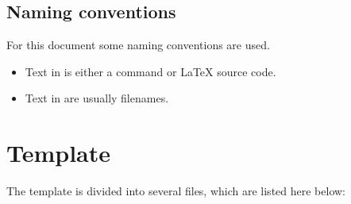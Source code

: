 \subsection{Naming conventions}

For this document some naming conventions are used.

\begin{itemize}
    \item Text in  is either a command or
          \LaTeX{} source code.
    \item Text in  are usually filenames.
\end{itemize}

\section{Template}
\label{sec:Template}

The template is divided into several files, which are listed here below:

